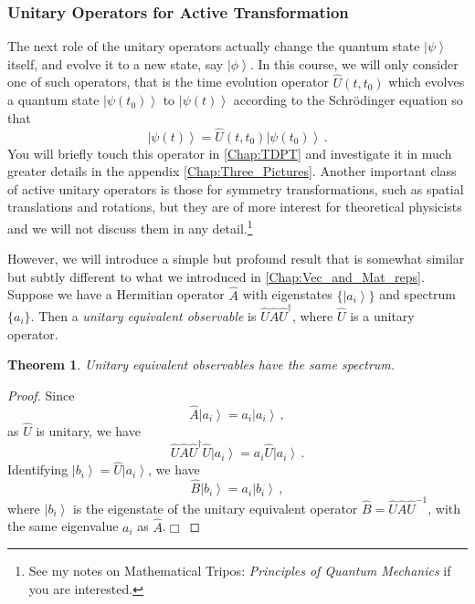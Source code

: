 \documentclass{article}
\theoremstyle{plain}\theoremheaderfont{\normalfont\itshape}\theorembodyfont{\rmfamily}\theoremseparator{.}\newtheorem*{rem}{Remark}\newtheorem*{ex}{Example}\newtheorem*{proof}{Proof}\newtheorem*{altp}{Alternative proof}
\theoremstyle{plain}\theoremheaderfont{\normalfont\bfseries}\theorembodyfont{\rmfamily}\theoremseparator{.}\newtheorem{thm}{Theorem}[section]\newtheorem{lem}[thm]{Lemma}\newtheorem{prop}[thm]{Proposition}\newtheorem*{cor}{Corollary}\newtheorem{defn}[thm]{Definition}\newtheorem{clm}[thm]{Claim}\newtheorem{clminproof}{Claim}
\theoremstyle{break}\theoremheaderfont{\normalfont\itshape}\theorembodyfont{\rmfamily}\theoremseparator{.\medskip}\newtheorem*{proofskip}{Proof}\newtheorem*{exs}{Examples}\newtheorem*{rems}{Remarks}
\theoremstyle{break}\theoremheaderfont{\normalfont\bfseries}\theorembodyfont{\rmfamily}\theoremseparator{.\medskip}\newtheorem{lemskip}[thm]{Lemma}\newtheorem{defnskip}[thm]{Definition}\newtheorem{propskip}[thm]{Proposition}\newtheorem{thmskip}[thm]{Theorem}
\numberwithin{equation}{section}
\newcommand{\qed}{\hfill\ensuremath{\Box}}
\newcommand{\ket}[1]{\left| #1 \right\rangle}
\begin{document}
    \subsubsection{Unitary Operators for Active Transformation}
    The next role of the unitary operators actually change the quantum state \(\ket{\psi}\) itself, and evolve it to a new state, say \(\ket{\phi}\). In this course, we will only consider one of such operators, that is the time evolution operator \(\hat{U}(t,t_0)\) which evolves a quantum state \(\ket{\psi(t_0)}\) to \(\ket{\psi(t)}\) according to the Schr\"{o}dinger equation so that
    \begin{equation}
        \ket{\psi(t)}=\hat{U}(t,t_0)\ket{\psi(t_0)}\,.
    \end{equation}
    You will briefly touch this operator in \cref{Chap:TDPT} and investigate it in much greater details in the appendix \cref{Chap:Three_Pictures}. Another important class of active unitary operators is those for symmetry transformations, such as spatial translations and rotations, but they are of more interest for theoretical physicists and we will not discuss them in any detail.\footnote{See my notes on Mathematical Tripos: \textit{Principles of Quantum Mechanics} if you are interested.}

    However, we will introduce a simple but profound result that is somewhat similar but subtly different to what we introduced in \cref{Chap:Vec_and_Mat_reps}. Suppose we have a Hermitian operator \(\hat{A}\) with eigenstates \(\{\ket{a_i}\}\) and spectrum \(\{a_i\}\). Then a \textit{unitary equivalent observable} is \(\hat{U}\hat{A}\hat{U}^\dagger\), where \(\hat{U}\) is a unitary operator.  
    \begin{thm}
        Unitary equivalent observables have the same spectrum.
    \end{thm}
    \begin{proof}
        Since
        \begin{equation}
            \hat{A}\ket{a_i}=a_i\ket{a_i}\,,
        \end{equation}
        as \(\hat{U}\) is unitary, we have
        \begin{equation}
            \hat{U}\hat{A}\hat{U}^\dagger\hat{U}\ket{a_i}=a_i\hat{U}\ket{a_i}\,.
        \end{equation}
        Identifying \(\ket{b_i}=\hat{U}\ket{a_i}\), we have
        \begin{equation}
            \hat{B}\ket{b_i}=a_i\ket{b_i}\,,
        \end{equation}
        where \(\ket{b_i}\) is the eigenstate of the unitary equivalent operator \(\hat{B}=\hat{U}\hat{A}\hat{U}^{-1}\), with the same eigenvalue \(a_i\) as \(\hat{A}\).\qed
    \end{proof}
    
\end{document}
